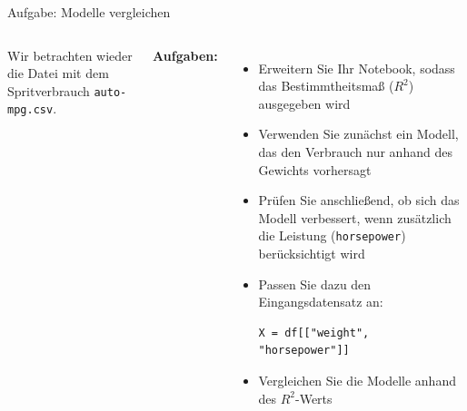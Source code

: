 \begin{frame}[fragile]{Aufgabe: Modelle vergleichen}
\begin{columns}

\footnotesize
Wir betrachten wieder die Datei mit dem Spritverbrauch  \texttt{auto-mpg.csv}.

\textbf{Aufgaben:}
\begin{itemize}
\item Erweitern Sie Ihr Notebook, sodass das Bestimmtheitsmaß ($R^2$) ausgegeben wird

\item Verwenden Sie zunächst ein Modell, das den Verbrauch nur anhand des Gewichts vorhersagt

\item Prüfen Sie anschließend, ob sich das Modell verbessert, wenn zusätzlich die Leistung (\texttt{horsepower}) berücksichtigt wird

\item Passen Sie dazu den Eingangsdatensatz an:
\begin{verbatim}
X = df[["weight", "horsepower"]]
\end{verbatim}

\item Vergleichen Sie die Modelle anhand des $R^2$-Werts
\end{itemize}



\end{columns}
\end{frame}

\makequestionspage{\FRAGENIMAGE}



